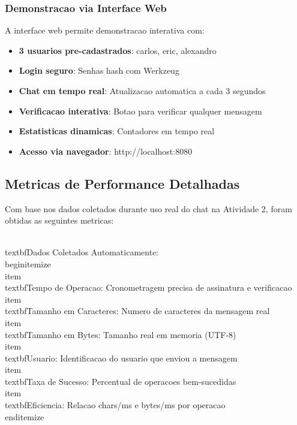 \documentclass[12pt,a4paper,oneside]{article}
\begin{document}
\subsubsection{Demonstracao via Interface Web}

A interface web permite demonstracao interativa com:

\begin{itemize}
    \item \textbf{3 usuarios pre-cadastrados}: carlos, eric, alexandro
    \item \textbf{Login seguro}: Senhas hash com Werkzeug
    \item \textbf{Chat em tempo real}: Atualizacao automatica a cada 3 segundos
    \item \textbf{Verificacao interativa}: Botao para verificar qualquer mensagem
    \item \textbf{Estatisticas dinamicas}: Contadores em tempo real
    \item \textbf{Acesso via navegador}: http://localhost:8080
\end{itemize}

\subsection{Metricas de Performance Detalhadas}

Com base nos dados coletados durante uso real do chat na Atividade 2, foram obtidas as seguintes metricas:

\\textbf{Dados Coletados Automaticamente:}
\\begin{itemize}
    \\item \\textbf{Tempo de Operacao}: Cronometragem precisa de assinatura e verificacao
    \\item \\textbf{Tamanho em Caracteres}: Numero de caracteres da mensagem real
    \\item \\textbf{Tamanho em Bytes}: Tamanho real em memoria (UTF-8)
    \\item \\textbf{Usuario}: Identificacao do usuario que enviou a mensagem
    \\item \\textbf{Taxa de Sucesso}: Percentual de operacoes bem-sucedidas
    \\item \\textbf{Eficiencia}: Relacao chars/ms e bytes/ms por operacao
\\end{itemize}
\end{document}
